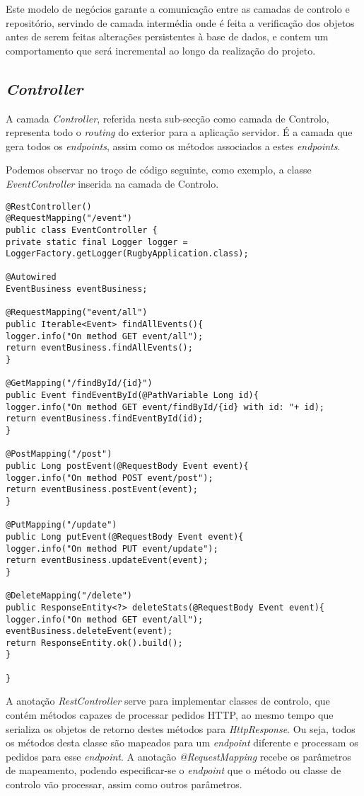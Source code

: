 Este modelo de negócios garante a comunicação entre as camadas de controlo e repositório, servindo de camada intermédia onde é feita a verificação dos objetos antes de serem feitas alterações persistentes à base de dados, e contem um comportamento que será incremental ao longo da realização do projeto.

\subsection{\emph{Controller}} \label{sec314}
A camada \emph{Controller}, referida nesta sub-secção como camada de Controlo, representa todo o \emph{routing} do exterior para a aplicação servidor. É a camada que gera todos os \emph{endpoints}, assim como os métodos associados a estes \emph{endpoints}. 

Podemos observar no troço de código seguinte, como exemplo, a classe \emph{EventController} inserida na camada de Controlo.

\begin{verbatim}
@RestController()
@RequestMapping("/event")
public class EventController {
private static final Logger logger = LoggerFactory.getLogger(RugbyApplication.class);

@Autowired
EventBusiness eventBusiness;

@RequestMapping("event/all")
public Iterable<Event> findAllEvents(){
logger.info("On method GET event/all");
return eventBusiness.findAllEvents();
}

@GetMapping("/findById/{id}")
public Event findEventById(@PathVariable Long id){
logger.info("On method GET event/findById/{id} with id: "+ id);
return eventBusiness.findEventById(id);
}

@PostMapping("/post")
public Long postEvent(@RequestBody Event event){
logger.info("On method POST event/post");
return eventBusiness.postEvent(event);
}

@PutMapping("/update")
public Long putEvent(@RequestBody Event event){
logger.info("On method PUT event/update");
return eventBusiness.updateEvent(event);
}

@DeleteMapping("/delete")
public ResponseEntity<?> deleteStats(@RequestBody Event event){
logger.info("On method GET event/all");
eventBusiness.deleteEvent(event);
return ResponseEntity.ok().build();
}

}
\end{verbatim}

A anotação \emph{RestController} serve para implementar classes de controlo, que contém métodos capazes de processar pedidos HTTP, ao mesmo tempo que serializa os objetos de retorno destes métodos para \emph{HttpResponse}.
Ou seja, todos os métodos desta classe são mapeados para um \emph{endpoint} diferente e processam os pedidos para esse \emph{endpoint}.
A anotação \emph{@RequestMapping} recebe os parâmetros de mapeamento, podendo especificar-se o \emph{endpoint} que o método ou classe de controlo vão processar, assim como outros parâmetros. 

